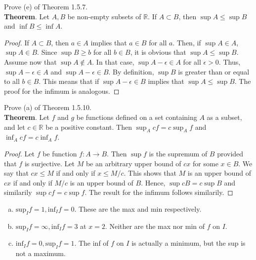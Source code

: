 \documentclass[12pt]{book}
\newenvironment{exercise}[2][Exercise]{\begin{trivlist}
\item[\hskip \labelsep {\bfseries #1}\hskip \labelsep {\bfseries #2.}]}{\end{trivlist}}
\begin{document}
\begin{exercise}{1.5.7}
Prove (e) of Theorem 1.5.7. \\

\textbf{Theorem}. Let $A,B$ be non-empty subsets of $\mathbb{R}$. If $A \subset B$, then $\sup A \leq \sup B$ and $\inf B \leq \inf A$.
	\begin{proof}
	If $A \subset B$, then $a \in A$ implies that $a \in B$ for all $a$. Then, if $\sup A \in A$, $\sup A \in B$. Since $\sup B \geq b$ for all $b \in B$, it is obvious that $\sup A \leq \sup B$. Assume now that $\sup A \notin A$. In that case, $\sup A - \epsilon \in A$ for all $\epsilon > 0$. Thus, $\sup A - \epsilon \in A$ and $\sup A - \epsilon \in B$. By definition, $\sup B$ is greater than or equal to all $b \in B$. This means  that if $\sup A - \epsilon \in B$ implies that $\sup A \leq \sup B$. The proof for the infimum is analogous.
	\end{proof}
\end{exercise}

\begin{exercise}{1.5.10}
Prove (a) of Theorem 1.5.10. \\

\textbf{Theorem}. Let $f$ and $g$ be functions defined on a set containing $A$ as a subset, and let $c \in \mathbb{R}$ be a positive constant. Then $\sup_A c f= c \sup_A f$ and $\inf_A c f = c \inf_A f$.
	\begin{proof}
	Let $f$ be function $f: A \to B$. Then $\sup f$ is the supremum of $B$ provided that $f$ is surjective. Let $M$ be an arbitrary upper bound of $cx$ for some $x \in B$. We say that $c x \leq M$ if and only if $x \leq M/c$. This shows that $M$ is an upper bound of $c x$ if and only if $M/c$ is an upper bound of $B$. Hence, $\sup c B = c \sup B$ and similarily $\sup c f = c \sup f$. The result for the infimum follows similarily.
	\end{proof}
\end{exercise}

\begin{exercise}{1.5.8}
\begin{enumerate}[(a)]
\item $\mathrm{sup}_I f = 1, \mathrm{inf}_I f = 0$. These are the max and min respectively. 
\item $\mathrm{sup}_I f = \infty, \mathrm{inf}_I f = 3$ at $x = 2$. Neither are the max nor min of $f$ on $I$. 
\item $\mathrm{inf}_I f = 0, \mathrm{sup}_I f = 1$. The inf of $f$ on $I$ is actually a minimum, but the sup is not a maximum. 
\end{enumerate}


\end{exercise}
\end{document}
